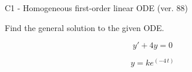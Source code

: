 \begin{exercise}
  \begin{exerciseTitle}C1 - Homogeneous first-order linear ODE (ver. 88)\end{exerciseTitle}
  \begin{exerciseStatement}
    
Find the general solution to the given ODE.

    
\[y'+4y=0\]

  \end{exerciseStatement}
  \begin{exerciseAnswer}
    
\[y= k e^{\left(-4 \, t\right)}\]

  \end{exerciseAnswer}
\end{exercise}